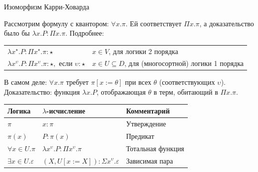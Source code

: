 \documentclass[aspectratio=169]{beamer}
\begin{document}
\begin{frame}{Изоморфизм Карри-Ховарда}

Рассмотрим формулу с квантором: $\forall x.\pi$.
Ей соответствует $\Pi x.\pi$, а доказательство было бы $\lambda x.P : \Pi x.\pi$. Подробнее:

\begin{center}\begin{tabular}{ll}
$\lambda x^\star.P : \Pi x^\star.\pi : \star$ & $x \in V$, для логики 2 порядка\\
$\lambda x^\upsilon.P : \Pi x^\upsilon.\pi : \star,\text{ если }\upsilon:\star$ & $x \in U\subseteq D$, для (многосортной) логики 1 порядка
\end{tabular}\end{center}

В самом деле: $\forall x.\pi$ требует $\pi[x := \theta]$ при всех $\theta$ (соответствующих $\upsilon$). 
Доказательство: функция $\lambda x.P$, отображающая $\theta$ в терм, обитающий в $\Pi x.\pi$.


\begin{center}\begin{tabular}{lll}
Логика & $\lambda$-исчисление & Комментарий \\\hline
$\pi$ & $x : \pi$ & Утверждение\\
$\pi(x)$ & $P : \pi(x)$ & Предикат\\
$\forall x\in U.\pi$ & $\lambda x^\upsilon.P : \Pi x^\upsilon.\pi$ & Тотальная функция\\
$\exists x\in U.\varepsilon$ & $ (X, U[x:=X]) : \Sigma x^\upsilon.\varepsilon$ & Зависимая пара
\end{tabular}\end{center}

\end{frame}

\end{document}

